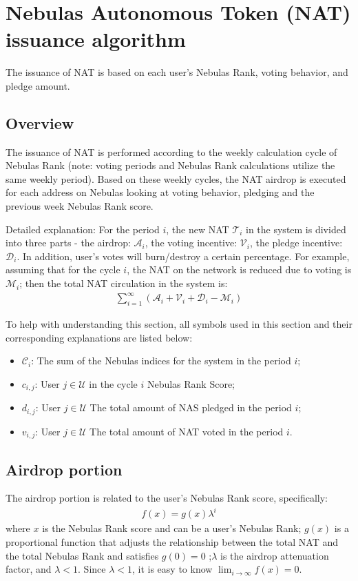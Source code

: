 \section{Nebulas Autonomous Token (NAT) ​​issuance algorithm}

The issuance of NAT is based on each user's Nebulas Rank, voting behavior, and pledge amount.

\subsection{Overview}
The issuance of NAT is performed according to the weekly calculation cycle of Nebulas Rank (note: voting periods and Nebulas Rank calculations utilize the same weekly period). Based on these weekly cycles, the NAT airdrop is executed for each address on Nebulas looking at voting behavior, pledging and the previous week Nebulas Rank score.

Detailed explanation: 
For the period $i$, the new NAT $\mathcal{T}_i$ in the system is divided into three parts - the airdrop: $\mathcal{A}_i$, the voting incentive: $\mathcal{V}_i$, the pledge incentive: $\mathcal{D}_i$.
In addition, user's votes will burn/destroy a certain percentage. For example, assuming that for the cycle $i$, the NAT on the network is reduced due to voting is $\mathcal{M}_i$; then the total NAT circulation in the system is:
\begin{align}
\sum_{i=1}^{\infty} (\mathcal{A}_i + \mathcal{V}_i + \mathcal{D}_i - \mathcal{M}_i)
\end{align}

To help with understanding this section, all symbols used in this section and their corresponding explanations are listed below:
\begin{itemize}
\item $\mathcal{C}_i$: The sum of the Nebulas indices for the system in the period $i$;
\item $c_{i,j}$: User $j \in \mathcal{U}$ in the cycle $i$ Nebulas Rank Score;
\item $d_{i,j}$: User $j \in \mathcal{U}$ The total amount of NAS pledged in the period $i$;
\item $v_{i,j}$: User $j \in \mathcal{U}$ The total amount of NAT voted in the period $i$.
\end{itemize}

\subsection{Airdrop portion}
The airdrop portion is related to the user's Nebulas Rank score, specifically:
\begin{align}
    f(x) = g(x)\lambda^i
\end{align}
\noindent where $x$ is the Nebulas Rank score and can be a user's Nebulas Rank; $g(x)$ is a proportional function that adjusts the relationship between the total NAT and the total Nebulas Rank and satisfies $g(0) = 0$ ;$\lambda$ is the airdrop attenuation factor, and $\lambda < 1$.
Since $\lambda < 1$, it is easy to know $\lim_{i\to \infty}f(x) = 0$.


